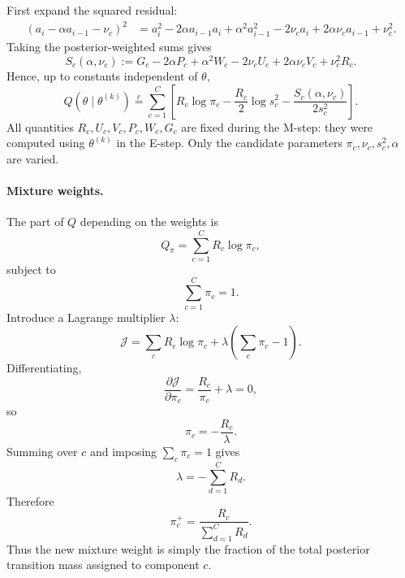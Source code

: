 First expand the squared residual:
\begin{align}
  (a_i-\alpha a_{i-1}-\nu_c)^2
  &=
  a_i^2
  -2\alpha a_{i-1}a_i
  +\alpha^2 a_{i-1}^2
  -2\nu_c a_i
  +2\alpha\nu_c a_{i-1}
  +\nu_c^2.
  \label{eq:em-residual-expand}
\end{align}
Taking the posterior-weighted sums gives
\begin{equation}
  S_c(\alpha,\nu_c)
  :=
  G_c
  -2\alpha P_c
  +\alpha^2W_c
  -2\nu_c U_c
  +2\alpha\nu_c V_c
  +\nu_c^2R_c.
  \label{eq:em-residual-stat}
\end{equation}
Hence, up to constants independent of $\theta$,
\begin{equation}
  \boxed{
  Q(\theta\mid\theta^{(k)})
  \overset{c}{=}
  \sum_{c=1}^{C}
  \left[
    R_c\log\pi_c
    -
    \frac{R_c}{2}\log s_c^2
    -
    \frac{
      S_c(\alpha,\nu_c)
    }{2s_c^2}
  \right].
  }
  \label{eq:em-Q-suffstats}
\end{equation}
All quantities $R_c,U_c,V_c,P_c,W_c,G_c$ are fixed during the M-step: they
were computed using $\theta^{(k)}$ in the E-step. Only the candidate
parameters $\pi_c,\nu_c,s_c^2,\alpha$ are varied.

\paragraph{Mixture weights.}

The part of $Q$ depending on the weights is
\begin{equation}
  Q_\pi
  =
  \sum_{c=1}^{C}
  R_c\log\pi_c,
\end{equation}
subject to
\begin{equation}
  \sum_{c=1}^{C}\pi_c=1.
\end{equation}
Introduce a Lagrange multiplier $\lambda$:
\begin{equation}
  \mathcal J
  =
  \sum_c R_c\log\pi_c
  +
  \lambda
  \left(
    \sum_c\pi_c-1
  \right).
\end{equation}
Differentiating,
\begin{equation}
  \frac{\partial\mathcal J}{\partial\pi_c}
  =
  \frac{R_c}{\pi_c}
  +
  \lambda
  =
  0,
\end{equation}
so
\begin{equation}
  \pi_c
  =
  -\frac{R_c}{\lambda}.
\end{equation}
Summing over $c$ and imposing $\sum_c\pi_c=1$ gives
\begin{equation}
  \lambda
  =
  -\sum_{d=1}^{C}R_d.
\end{equation}
Therefore
\begin{equation}
  \boxed{
  \pi_c^{+}
  =
  \frac{R_c}{
    \displaystyle\sum_{d=1}^{C}R_d
  }.
  }
  \label{eq:em-mstep-pi}
\end{equation}
Thus the new mixture weight is simply the fraction of the total posterior
transition mass assigned to component $c$.

